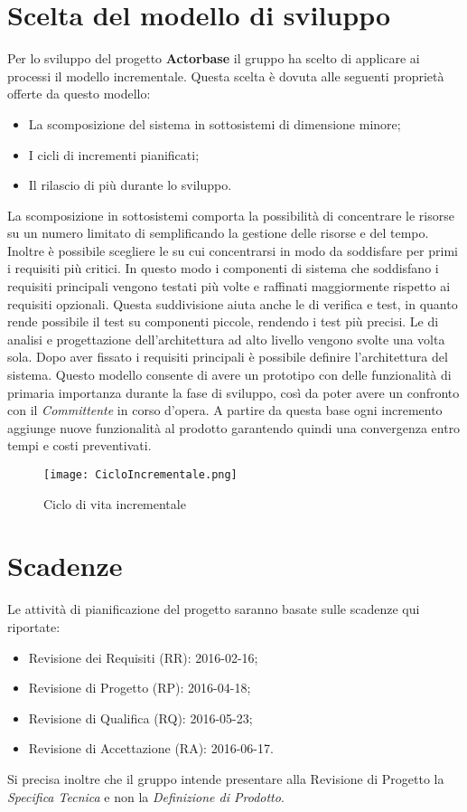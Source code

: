 \documentclass{scalatekids-article}
\begin{document}
\section{Scelta del modello di sviluppo}
Per lo sviluppo del progetto \textbf{Actorbase} il gruppo ha scelto di applicare
ai processi il modello incrementale. Questa scelta è dovuta alle seguenti
proprietà offerte da questo modello:
\begin{itemize}
\item {La scomposizione del sistema in sottosistemi di dimensione minore;}
\item {I cicli di incrementi pianificati;}
\item {Il rilascio di più  durante lo sviluppo.}
\end{itemize}
La scomposizione in sottosistemi comporta la possibilità di concentrare le
risorse su un numero limitato di  semplificando la gestione delle
risorse e del tempo. Inoltre è possibile scegliere le  su cui
concentrarsi in modo da soddisfare per primi i requisiti più critici. In questo
modo i componenti di sistema che soddisfano i requisiti principali vengono testati più
volte e raffinati maggiormente rispetto ai requisiti opzionali. Questa
suddivisione aiuta anche le  di verifica e test, in quanto rende possibile
il test su componenti piccole, rendendo i test più precisi. Le  di
analisi e progettazione dell'architettura ad alto livello vengono svolte una
volta sola. Dopo aver fissato i requisiti principali è possibile definire
l'architettura del sistema. Questo modello consente di avere un prototipo con
delle funzionalità di primaria importanza durante la fase di sviluppo, così da
poter avere un confronto con il \textit{Committente} in corso d'opera. A partire da
questa base ogni incremento aggiunge nuove funzionalità al prodotto garantendo
quindi una convergenza entro tempi e costi preventivati.
\begin{figure}[H]
  \begin{center}
    \texttt{[image: CicloIncrementale.png]}
    \caption{Ciclo di vita incrementale}
  \end{center}
\end{figure}
\section{Scadenze}
Le attività di pianificazione del progetto saranno basate sulle scadenze qui riportate:
\begin{itemize}
\item {Revisione dei Requisiti (RR): 2016-02-16;}
\item {Revisione di Progetto (RP): 2016-04-18;}
\item {Revisione di Qualifica (RQ): 2016-05-23;}
\item {Revisione di Accettazione (RA): 2016-06-17.}
\end{itemize}
Si precisa inoltre che il gruppo intende presentare alla Revisione di Progetto la \textit{Specifica Tecnica} e non la \textit{Definizione di Prodotto}.
\end{document}

